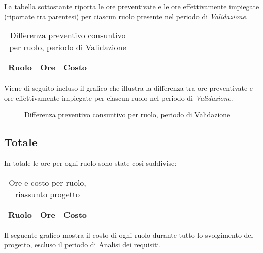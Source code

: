 La tabella sottostante riporta le ore preventivate e le ore effettivamente impiegate (riportate tra parentesi) per ciascun ruolo presente nel periodo di \textit{Validazione}.

\begin{table}[H]
\centering
\begin{tabular}{lccccccc}
\toprule
    \textbf{Ruolo}  & \textbf{Ore} & \textbf{Costo} \\
    \midrule
    
    	
    
    \bottomrule
\end{tabular}
\caption{Differenza preventivo consuntivo per ruolo, periodo di Validazione}
\end{table}

Viene di seguito incluso il grafico che illustra la differenza tra ore preventivate e ore effettivamente impiegate per ciascun ruolo nel periodo di \textit{Validazione}.

\begin{figure}[H]
\centering
{}
\caption{Differenza preventivo consuntivo per ruolo, periodo di Validazione}
\end{figure}

\subsection{Totale}

In totale le ore per ogni ruolo sono state cosi suddivise:

\begin{table}[H]
	\centering
	\begin{tabular}{ l c c }
	\textbf{Ruolo} & \textbf{Ore} & \textbf{Costo} \\
	\hline
	
		
	
	\end{tabular}
	\caption{Ore e costo per ruolo, riassunto progetto}
	\end{table}

Il seguente grafico mostra il costo di ogni ruolo durante tutto lo svolgimento del progetto, escluso il periodo di Analisi dei requisiti.

